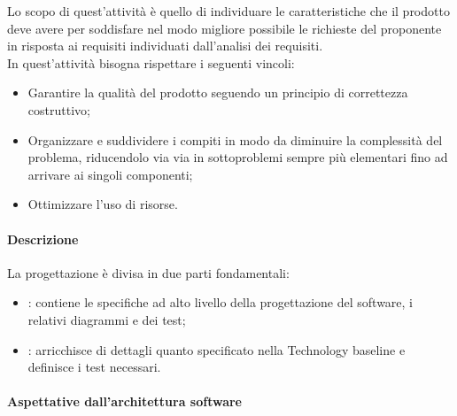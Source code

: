 Lo scopo di quest'attività è quello di individuare le caratteristiche che il prodotto deve avere per soddisfare nel
modo migliore possibile le richieste del proponente in risposta ai requisiti individuati dall'analisi dei requisiti. \\
In quest'attività bisogna rispettare i seguenti vincoli:
\begin{itemize}
    \item Garantire la qualità del prodotto seguendo un principio di correttezza costruttivo;
    \item Organizzare e suddividere i compiti in modo da diminuire la complessità del problema, riducendolo via via in
    sottoproblemi sempre più elementari fino ad arrivare ai singoli componenti;
    \item Ottimizzare l'uso di risorse.
\end{itemize}

\paragraph{Descrizione}
La progettazione è divisa in due parti fondamentali:
\begin{itemize}
    \item {}: contiene le specifiche ad alto livello della progettazione del software,
    i relativi diagrammi  e dei test;
    \item {}: arricchisce di dettagli quanto specificato nella Technology baseline e
    definisce i test necessari.
\end{itemize}

\paragraph{Aspettative dall'architettura software}

